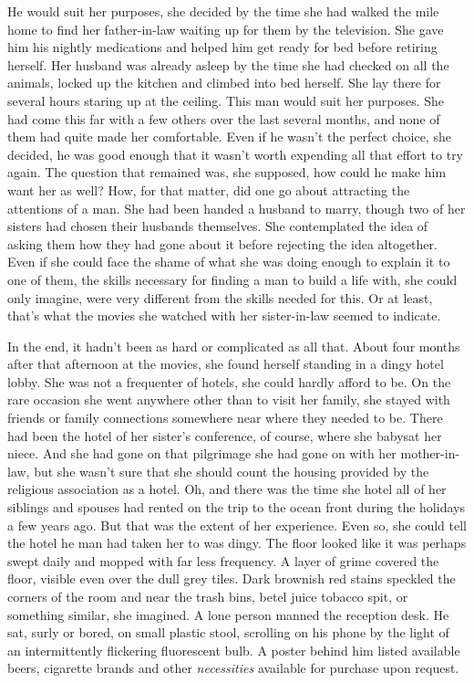 \documentclass{article}
\begin{document}
He would suit her purposes, she decided by the time she had walked the mile home to find her father-in-law waiting up for them by the television. She gave him his nightly medications and helped him get ready for bed before retiring herself. Her husband was already asleep by the time she had checked on all the animals, locked up the kitchen and climbed into bed herself. She lay there for several hours staring up at the ceiling. This man would suit her purposes. She had come this far with a few others over the last several months, and none of them had quite made her comfortable. Even if he wasn't the perfect choice, she decided, he was good enough that it wasn't worth expending all that effort to try again. The question that remained was, she supposed, how could he make him want her as well? How, for that matter, did one go about attracting the attentions of a man. She had been handed a husband to marry, though two of her sisters had chosen their husbands themselves. She contemplated the idea of asking them how they had gone about it before rejecting the idea altogether. Even if she could face the shame of what she was doing enough to explain it to one of them, the skills necessary for finding a man to build a life with, she could only imagine, were very different from the skills needed for this. Or at least, that's what the movies she watched with her sister-in-law seemed to indicate.

In the end, it hadn't been as hard or complicated as all that. About four months after that afternoon at the movies, she found herself standing in a dingy hotel lobby. She was not a frequenter of hotels, she could hardly afford to be. On the rare occasion she went anywhere other than to visit her family, she stayed with friends or family connections somewhere near where they needed to be. There had been the hotel of her sister's conference, of course, where she babysat her niece. And she had gone on that pilgrimage she had gone on with her mother-in-law, but she wasn't sure that she should count the housing provided by the religious association as a hotel. Oh, and there was the time she hotel all of her siblings and spouses had rented on the trip to the ocean front during the holidays a few years ago. But that was the extent of her experience. Even so, she could tell the hotel he man had taken her to was dingy. The floor looked like it was perhaps swept daily and mopped with far less frequency. A layer of grime covered the floor, visible even over the dull grey tiles. Dark brownish red stains speckled the corners of the room and near the trash bins, betel juice tobacco spit, or something similar, she imagined. A lone person manned the reception desk. He sat, surly or bored, on small plastic stool, scrolling on his phone by the light of an intermittently flickering fluorescent bulb. A poster behind him listed available beers, cigarette brands and other \emph{necessities} available for purchase upon request. 
\end{document}
